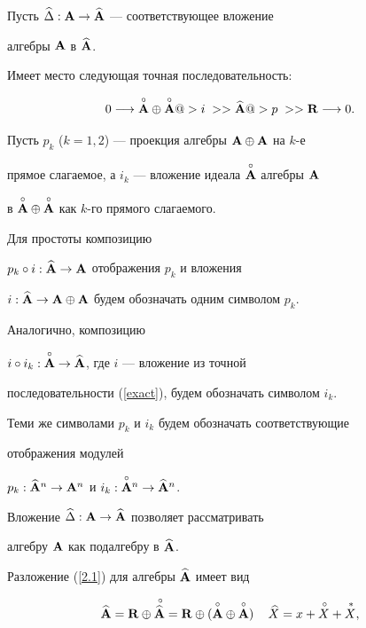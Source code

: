 Пусть $\widehat\Delta:{\bold A}\to\widehat{{\bold A}}$ --- соответствующее вложение


алгебры  ${\bold A}$ в $\widehat{{\bold A}}$.


Имеет место следующая точная последовательность:


\begin{equation}


\label{exact}


0\longrightarrow\Ao\oplus\Ao @>{i\;}>> 


\widehat\A@>{p\;}>> \R \longrightarrow 0.


\end{equation}


Пусть $p_k$ ($k=1,2$) --- проекция алгебры ${\bold A}\oplus{\bold A}$ на  $k$-е


прямое слагаемое, а  $i_k$ --- вложение идеала  $\overset{\circ}{\bold A}{}$ алгебры ${\bold A}$


в $\overset{\circ}{\bold A}{}\oplus\overset{\circ}{\bold A}{}$ как $k$-го прямого слагаемого.


Для простоты композицию


$p_k\circ i:\widehat{{\bold A}}\to{\bold A}$ отображения $p_k$ и вложения


$i:\widehat{{\bold A}}\to{\bold A}\oplus{\bold A}$ будем обозначать одним символом $p_k$.


Аналогично, композицию


$i\circ i_k:\overset{\circ}{\bold A}{}\to\widehat{{\bold A}}$, где $i$ --- вложение из точной


последовательности  (\ref{exact}), будем обозначать символом $i_k$.


Теми же символами  $p_k$ и $i_k$ будем обозначать соответствующие


отображения модулей


$p_k:\widehat{{\bold A}}{}^n\to{\bold A}^n$ и  $i_k:\overset{\circ}{\bold A}{}^n\to\widehat{{\bold A}}{}^n$.


Вложение  $\widehat\Delta:{\bold A}\to\widehat{{\bold A}}$ позволяет рассматривать


алгебру ${\bold A}$ как подалгебру в  $\widehat{{\bold A}}$.


Разложение  (\ref{2.1}) для алгебры $\widehat{{\bold A}}$ имеет вид


\begin{equation}


\widehat\A=\R\oplus{\puto {\widehat\A}}=


\R\oplus({\Ao}\oplus{\Ao})\, \quad


\widehat{X}=x+\puto{X}+\puts{X},


\label{2.1'}


\end{equation}


